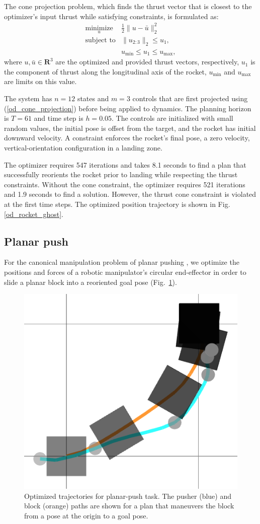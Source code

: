 The cone projection problem, which finds the thrust vector that is closest to the optimizer's input thrust while satisfying constraints, is formulated as:
\begin{equation}
	\begin{array}{ll}
		\underset{u}{\mbox{minimize}} & \frac{1}{2} \|u - \bar{u}\|_2^2 \\
		\mbox{subject to} & \|u_{2:3}\|_2 \leq u_1, \\
		& u_{\mbox{min}} \leq u_1 \leq u_{\mbox{max}},
	\end{array} \label{od_cone_projection}
\end{equation}
where $u, \bar{u} \in \mathbf{R}^3$ are the optimized and provided thrust vectors, respectively, $u_1$ is the component of thrust along the longitudinal axis of the rocket, $u_{\mbox{min}}$ and $u_{\mbox{max}}$ are limits on this value.

The system has $n = 12$ states and $m = 3$ controls that are first projected using (\ref{od_cone_projection}) before being applied to dynamics. The planning horizon is $T = 61$ and time step is $h = 0.05$. The controls are initialized with small random values, the initial pose is offset from the target, and the rocket has initial downward velocity. A constraint enforces the rocket's final pose, a zero velocity, vertical-orientation configuration in a landing zone.

The optimizer requires 547 iterations and takes 8.1 seconds to find a plan that successfully reorients the rocket prior to landing while respecting the thrust constraints. Without the cone constraint, the optimizer requires 521 iterations and 1.9 seconds to find a solution. However, the thrust cone constraint is violated at the first time steps. The optimized position trajectory is shown in Fig. \ref{od_rocket_ghost}.

\subsection{Planar push}
For the canonical manipulation problem of planar pushing \cite{hogan2016feedback}, we optimize the positions and forces of a robotic manipulator's circular end-effector in order to slide a planar block into a reoriented goal pose (Fig.~\ref{od_planar_push}).

\begin{figure}[H]
	\centering
	\includegraphics[width=.3\textwidth]{optimization_dynamics/planar_push_rotate_crop_2.png}
	\caption[Plan for planar-push task]{Optimized trajectories for planar-push task. The pusher (blue) and block (orange) paths are shown for a plan that maneuvers the block from a pose at the origin to a goal pose.}
	\label{od_planar_push}
\end{figure}

